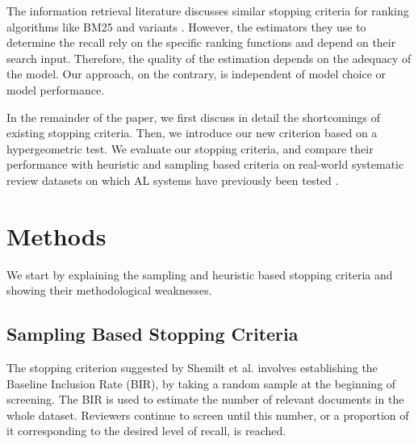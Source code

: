 \documentclass{bmcart}
\begin{document}
	The information retrieval literature discusses similar stopping criteria for ranking algorithms like BM25 and variants \cite{DiNunzio2018, Yu2019}. However, the estimators they use to determine the recall rely on the specific ranking functions and depend on their search input. Therefore, the quality of the estimation depends on the adequacy of the model. Our approach, on the contrary, is independent of model choice or model performance. 
	
	In the remainder of the paper, we first discuss in detail the shortcomings of existing stopping criteria. Then, we introduce our new criterion based on a hypergeometric test. We evaluate our stopping criteria, and compare their performance with heuristic and sampling based criteria on real-world systematic review datasets on which AL systems have previously been tested \cite{Cohen2006, Yu2019, Terasawa2009, Castaldi2009}.
	
	\section*{Methods}

	
	
	We start by explaining the sampling and heuristic based stopping criteria and showing their methodological weaknesses. 
	
	\subsection*{Sampling Based Stopping Criteria}
	
	The stopping criterion suggested by Shemilt et al. \cite{Shemilt2014} involves establishing the Baseline Inclusion Rate (BIR), by taking a random sample at the beginning of screening. 
	The BIR is used to estimate the number of relevant documents in the whole dataset. 
	Reviewers continue to screen until this number, or a proportion of it corresponding to the desired level of recall, is reached.
	
\end{document}
